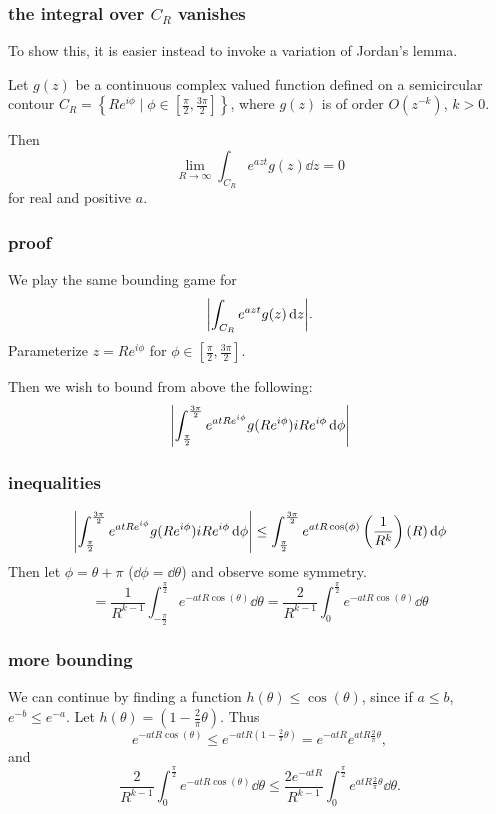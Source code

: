 \documentclass[mathserif]{beamer}
\newcommand{\br}[1]{\left(#1\right)}
\newcommand{\sbr}[1]{\left[#1\right]}
\newcommand{\cbr}[1]{\left\{#1\right\}}
\begin{document}
\begin{frame}
  \frametitle{the integral over $C_R$ vanishes}

  To show this, it is easier instead to invoke a variation of Jordan's lemma.

  \begin{lemma}
    Let $g(z)$ be a continuous complex valued function defined on a semicircular contour $C_R = \cbr{Re^{i \phi}\mid \phi \in\sbr{\frac{\pi}{2},\frac{3\pi}{2}}}$, where $g(z)$ is of order $O(z^{-k})$, $k>0$.
    
    Then \[\lim_{R\to\infty}\int_{C_R}e^{azt}g(z)\dd{z} = 0\] for real and positive $a$.
  \end{lemma}


\end{frame}

\begin{frame}
  \frametitle{proof}

  We play the same bounding game for \[\abs{\int_{C_R}e^{azt}g(z)\dd{z}}.\] Parameterize $z = Re^{i\phi}$ for $\phi \in\sbr{\frac{\pi}{2},\frac{3\pi}{2}}$.

  \pause Then we wish to bound from above the following: \[\abs{\int_{\frac{\pi}{2}}^{\frac{3\pi}{2}}e^{atRe^{i\phi}}g(Re^{i\phi})iRe^{i\phi}\dd{\phi}}\]

\end{frame}

\begin{frame}
  \frametitle{inequalities}

  \[\abs{\int_{\frac{\pi}{2}}^{\frac{3\pi}{2}}e^{atRe^{i\phi}}g(Re^{i\phi})iRe^{i\phi}\dd{\phi}}\leq \int_{\frac{\pi}{2}}^{\frac{3\pi}{2}} e^{atR\cos(\phi)}\br{\frac{1}{R^{k}}}(R)\dd{\phi}\] \pause Then let $\phi = \theta + \pi$ ($\dd{\phi} = \dd{\theta}$) and observe some symmetry. \[ = \frac{1}{R^{k-1}}\int_{-\frac{\pi}{2}}^{\frac{\pi}{2}}e^{-atR\cos(\theta)}\dd{\theta} = \frac{2}{R^{k-1}}\int_{0}^{\frac{\pi}{2}}e^{-atR\cos(\theta)}\dd{\theta}\]

\end{frame}

\begin{frame}
  \frametitle{more bounding}

  We can continue by finding a function $h(\theta)\leq \cos(\theta)$, since if $a\leq b$, $e^{-b}\leq e^{-a}$. Let $h(\theta) = \br{1-\frac{2}{\pi}\theta}$. \pause Thus \[e^{-atR\cos(\theta)} \leq e^{-atR\br{1-\frac{2}{\pi}\theta}} = e^{-atR}e^{atR\frac{2}{\pi}\theta},\] \pause and \[\frac{2}{R^{k-1}}\int_{0}^{\frac{\pi}{2}}e^{-atR\cos(\theta)}\dd{\theta}\leq \frac{2e^{-atR}}{R^{k-1}}\int_{0}^{\frac{\pi}{2}}e^{atR\frac{2}{\pi}\theta}\dd{\theta}.\]

\end{frame}
\end{document}
